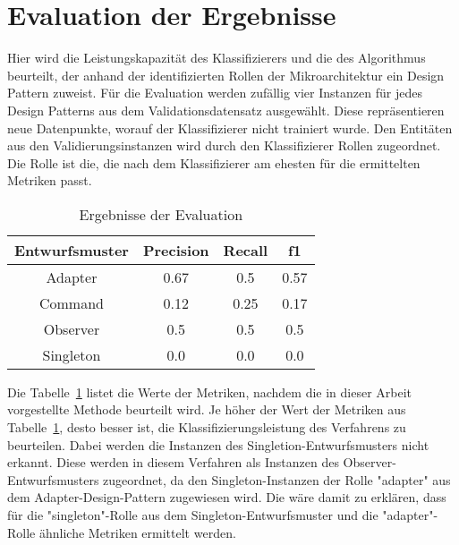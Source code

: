 \section{Evaluation der Ergebnisse}
Hier wird die Leistungskapazität des Klassifizierers und die des Algorithmus beurteilt, der anhand der identifizierten Rollen der Mikroarchitektur ein Design Pattern zuweist. 
Für die Evaluation werden zufällig vier Instanzen für jedes Design Patterns aus dem Validationsdatensatz ausgewählt.
Diese repräsentieren neue Datenpunkte, worauf der Klassifizierer nicht trainiert wurde.
Den Entitäten aus den Validierungsinstanzen wird durch den Klassifizierer Rollen zugeordnet. Die Rolle ist die, die nach dem Klassifizierer am ehesten für die ermittelten Metriken passt.


\begin{table}[H]
    \centering
    \caption{Ergebnisse der Evaluation}
    \label{tab:evaluation}
    \begin{tabular}{|c|c|c|c|}
        \hline
        Entwurfsmuster & Precision & Recall & f1\\
        \hline
        Adapter & 0.67 & 0.5 & 0.57\\
        Command & 0.12 & 0.25 & 0.17\\
        Observer & 0.5 & 0.5 & 0.5\\
        Singleton & 0.0 & 0.0 & 0.0\\ 
        \hline
    \end{tabular}
\end{table}

Die Tabelle~\ref{tab:evaluation} listet die Werte der Metriken, nachdem die in dieser Arbeit vorgestellte Methode beurteilt wird.
Je höher der Wert der Metriken aus Tabelle~\ref{tab:evaluation}, desto besser ist, die Klassifizierungsleistung des Verfahrens zu beurteilen.  
Dabei werden die Instanzen des Singletion-Entwurfsmusters nicht erkannt. Diese werden in diesem Verfahren als Instanzen des Observer-Entwurfsmusters zugeordnet, da den Singleton-Instanzen der Rolle "adapter" aus dem Adapter-Design-Pattern zugewiesen wird.
Die wäre damit zu erklären, dass für die "singleton"-Rolle aus dem Singleton-Entwurfsmuster und die "adapter"-Rolle ähnliche Metriken ermittelt werden.

